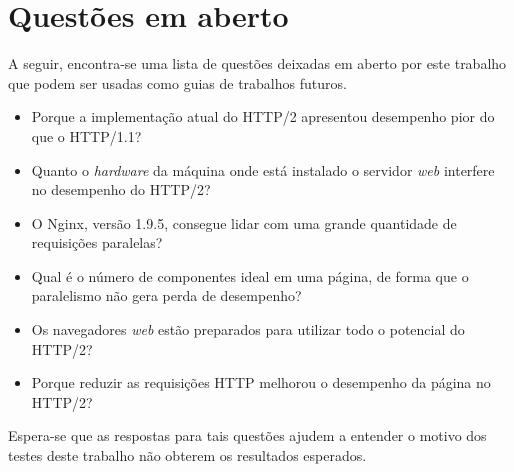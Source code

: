 \section{Questões em aberto}
\label{questoesemaberto}

A seguir, encontra-se uma lista de questões deixadas em aberto por este trabalho que podem ser usadas como guias de trabalhos futuros.

\begin{itemize}
	\item Porque a implementação atual do HTTP/2 apresentou desempenho pior do que o HTTP/1.1?
	\item Quanto o \textit{hardware} da máquina onde está instalado o servidor \textit{web} interfere no desempenho do HTTP/2?
	\item O Nginx, versão 1.9.5, consegue lidar com uma grande quantidade de requisições paralelas?
	\item Qual é o número de componentes ideal em uma página, de forma que o paralelismo não gera perda de desempenho?
	\item Os navegadores \textit{web} estão preparados para utilizar todo o potencial do HTTP/2?
	\item Porque reduzir as requisições HTTP melhorou o desempenho da página no HTTP/2?
\end{itemize}

Espera-se que as respostas para tais questões ajudem a entender o motivo dos testes deste trabalho não obterem os resultados esperados.